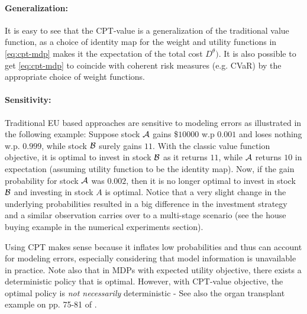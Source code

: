 \documentclass[11pt,letterpaper,english]{article}
\begin{document}
\paragraph{Generalization:} It is easy to see that the CPT-value is a generalization of the traditional value function, as a choice of identity map for the weight and utility functions in \eqref{eq:cpt-mdp} makes it the expectation of the total cost $D^\theta)$.  It is also possible to get \eqref{eq:cpt-mdp} to coincide with coherent risk measures (e.g. CVaR) by the appropriate choice of weight functions.

\paragraph{Sensitivity:}
Traditional EU based approaches are sensitive to modeling errors as illustrated in the following example: 
Suppose stock $\cal{A}$ gains \$$10000$ w.p $0.001$ and loses nothing w.p. $0.999$, while stock $\cal B$ surely gains $11$. With the classic value function objective, it is optimal to invest in stock $\cal B$ as it returns $11$,  while $\cal A$ returns $10$ in expectation (assuming utility function to be the identity map). Now, if the gain probability for stock $\cal A$ was $0.002$, then it is no longer optimal to invest in stock $\cal B$ and investing in stock $A$ is optimal.
Notice that a very slight change in the underlying probabilities resulted in a big difference in the investment strategy and a similar observation carries over to a multi-stage scenario (see the house buying example in the numerical experiments section). 

Using CPT makes sense because it inflates low probabilities and thus can account for modeling errors, especially considering that model information is unavailable in practice.
Note also that in MDPs with expected utility objective, there exists a deterministic policy that is optimal. However, with CPT-value objective, the optimal policy is \textit{not necessarily} deterministic - See also the organ transplant example on pp. 75-81 of \cite{lin2013stochastic}. 



\end{document}
